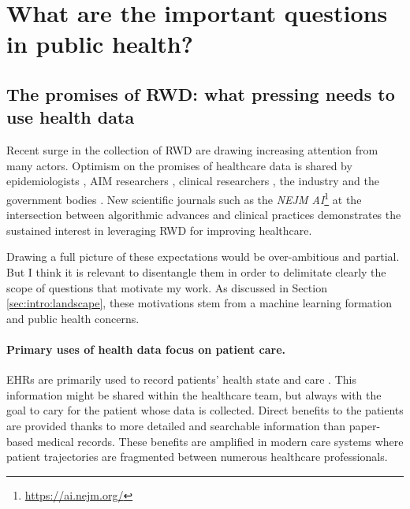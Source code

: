 \documentclass[french,12pt,twoside,a4paper]{book}
\begin{document}


\section{What are the important questions in public health?}%
\label{sec:intro:causality}%

\subsection{The promises of RWD: what pressing needs to use health data}

Recent surge in the collection of RWD are drawing increasing attention from many
actors. Optimism on the promises of healthcare data is shared by epidemiologists
\citep{mooney2015epidemiology,hernan2016using}, AIM researchers
\citep{schwartz1987artificial, yu2018artificial}, clinical researchers
\citep{schwalbe2020artificial,dzau2023anticipating}, the industry
\citep{pfizer2019rwd,iqvia2023rwd} and the government bodies
\citep{mcginnis2013best,fda_real_2018,ema2023rwd}. New scientific journals such
as the \emph{NEJM AI}\footnote{\url{https://ai.nejm.org/}} \citep{beam_2023} at
the intersection between algorithmic advances and clinical practices
demonstrates the sustained interest in leveraging RWD for improving healthcare.

Drawing a full picture of these expectations would be over-ambitious and
partial. But I think it is relevant to disentangle them in order to delimitate
clearly the scope of questions that motivate my work. As discussed in Section
\ref{sec:intro:landscape}, these motivations stem from a machine learning
formation and public health concerns.

\paragraph{Primary uses of health data focus on patient care.}

EHRs are primarily used to record patients' health state and care
\citep{safran_toward_2007,eu_primary_2022}. This information might be shared
within the healthcare team, but always with the goal to cary for the patient
whose data is collected. Direct benefits to the patients are provided thanks to
more detailed and searchable information than paper-based medical records. These
benefits are amplified in modern care systems where patient trajectories are
fragmented between numerous healthcare professionals.
\end{document}
